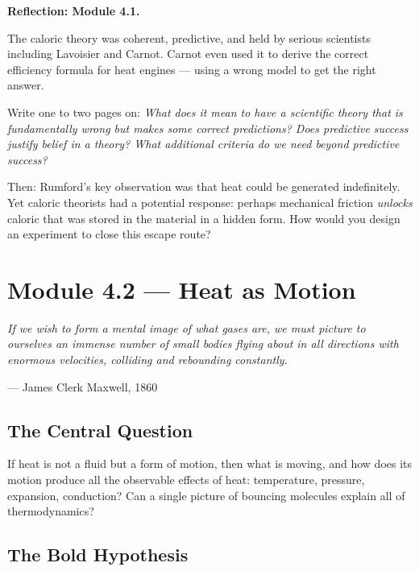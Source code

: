 \documentclass[12pt, a4paper, twoside]{book}
\begin{document}
\begin{reflectionbox}
\textbf{Reflection: Module 4.1.}

The caloric theory was coherent, predictive, and held by serious scientists including Lavoisier and Carnot. Carnot even used it to derive the correct efficiency formula for heat engines --- using a wrong model to get the right answer.

Write one to two pages on: \textit{What does it mean to have a scientific theory that is fundamentally wrong but makes some correct predictions? Does predictive success justify belief in a theory? What additional criteria do we need beyond predictive success?}

Then: Rumford's key observation was that heat could be generated indefinitely. Yet caloric theorists had a potential response: perhaps mechanical friction \textit{unlocks} caloric that was stored in the material in a hidden form. How would you design an experiment to close this escape route?
\end{reflectionbox}

\section{Module 4.2 — Heat as Motion}
\label{sec:kinetic_theory}

\epigraph{\itshape
  If we wish to form a mental image of what gases are, we must picture
  to ourselves an immense number of small bodies flying about in all
  directions with enormous velocities, colliding and rebounding constantly.
}{--- James Clerk Maxwell, 1860}

\subsection{The Central Question}

\begin{puzzlebox}
If heat is not a fluid but a form of motion, then what is moving, and how does its motion produce all the observable effects of heat: temperature, pressure, expansion, conduction? Can a single picture of bouncing molecules explain all of thermodynamics?
\end{puzzlebox}

\subsection{The Bold Hypothesis}
\end{document}
